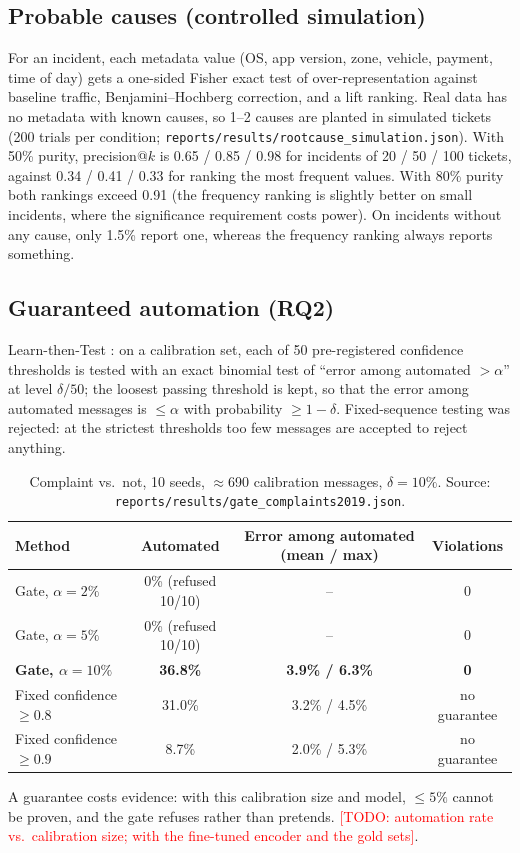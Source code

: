 \documentclass[11pt,a4paper]{article}
\newcommand{\todo}[1]{\textcolor{red}{[TODO: #1]}}
\newcommand{\res}[1]{\texttt{\small reports/results/#1}}
\begin{document}
\subsection{Probable causes (controlled simulation)}
For an incident, each metadata value (OS, app version, zone, vehicle, payment, time of day) gets a
one-sided Fisher exact test of over-representation against baseline traffic, Benjamini--Hochberg
correction, and a lift ranking. Real data has no metadata with known causes, so 1--2 causes are
planted in simulated tickets (200 trials per condition; \res{rootcause\_simulation.json}).
With 50\% purity, precision@$k$ is 0.65 / 0.85 / 0.98 for incidents of 20 / 50 / 100 tickets, against
0.34 / 0.41 / 0.33 for ranking the most frequent values. With 80\% purity both rankings exceed 0.91 (the
frequency ranking is slightly better on small incidents, where the significance requirement costs
power). On incidents without any cause, only 1.5\% report one, whereas the frequency ranking always
reports something.

\subsection{Guaranteed automation (RQ2)}
\label{sec:gate}
Learn-then-Test \citep{angelopoulos2021ltt}: on a calibration set, each of 50 pre-registered
confidence thresholds is tested with an exact binomial test of ``error among automated $> \alpha$''
at level $\delta/50$; the loosest passing threshold is kept, so that the error among automated
messages is $\leq \alpha$ with probability $\geq 1-\delta$. Fixed-sequence testing was rejected: at
the strictest thresholds too few messages are accepted to reject anything.

\begin{table}[h]
\centering\small
\begin{tabular}{lccc}
\toprule
Method & Automated & Error among automated (mean / max) & Violations \\
\midrule
Gate, $\alpha=2\%$ & 0\% (refused 10/10) & -- & 0 \\
Gate, $\alpha=5\%$ & 0\% (refused 10/10) & -- & 0 \\
\textbf{Gate, $\alpha=10\%$} & \textbf{36.8\%} & \textbf{3.9\% / 6.3\%} & \textbf{0} \\
Fixed confidence $\geq 0.8$ & 31.0\% & 3.2\% / 4.5\% & no guarantee \\
Fixed confidence $\geq 0.9$ & 8.7\% & 2.0\% / 5.3\% & no guarantee \\
\bottomrule
\end{tabular}
\caption{Complaint vs.\ not, 10 seeds, $\approx$690 calibration messages, $\delta=10\%$. Source:
\res{gate\_complaints2019.json}.}
\end{table}
A guarantee costs evidence: with this calibration size and model, $\leq 5\%$ cannot be proven, and
the gate refuses rather than pretends. \todo{automation rate vs.\ calibration size; with the
fine-tuned encoder and the gold sets}.
\end{document}
